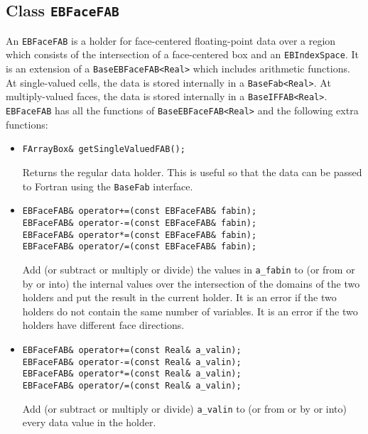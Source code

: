 \subsection{Class {\tt EBFaceFAB}}
\label{sec::ebfacefab}

An {\tt EBFaceFAB} is a holder for face-centered 
floating-point data over a region
which consists of the intersection
of a face-centered box and an {\tt EBIndexSpace}.  It is 
an extension of a \verb/BaseEBFaceFAB<Real>/ which includes
arithmetic functions.  At single-valued cells, the data is stored
internally in a \verb/BaseFab<Real>/.  At multiply-valued 
faces, the data is stored internally in a  {\verb/BaseIFFAB<Real>/}.
{\tt EBFaceFAB} has all the functions of \verb/BaseEBFaceFAB<Real>/
and the following extra functions:
\begin{itemize}
\item \begin{verbatim}
FArrayBox& getSingleValuedFAB();
\end{verbatim}
Returns the regular data holder.  This is useful so
that the data can be passed to Fortran using the {\tt BaseFab}
interface.

\item \begin{verbatim}
EBFaceFAB& operator+=(const EBFaceFAB& fabin); 
EBFaceFAB& operator-=(const EBFaceFAB& fabin); 
EBFaceFAB& operator*=(const EBFaceFAB& fabin); 
EBFaceFAB& operator/=(const EBFaceFAB& fabin); 
\end{verbatim}
Add (or subtract or multiply or divide) 
the values in {\verb/a_fabin/} to (or from or by or into) 
the internal values
over the intersection of the domains of the two holders
and put the result in the current holder.
It is an error if the two holders do not contain the same number
of variables.
It is an error if the two holders have different face directions.

\item \begin{verbatim}
EBFaceFAB& operator+=(const Real& a_valin); 
EBFaceFAB& operator-=(const Real& a_valin); 
EBFaceFAB& operator*=(const Real& a_valin); 
EBFaceFAB& operator/=(const Real& a_valin); 
\end{verbatim}
Add (or subtract or multiply or divide) 
\verb/a_valin/ to (or from or by or into) every data value in the holder.
\end{itemize}

